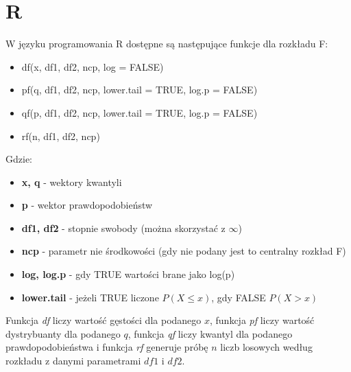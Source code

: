 \documentclass{article}
\begin{document}
{\section{R}
W języku programowania R dostępne są następujące funkcje dla rozkładu F:
\begin{itemize}
\item df(x, df1, df2, ncp, log = FALSE)
\item pf(q, df1, df2, ncp, lower.tail = TRUE, log.p = FALSE)
\item qf(p, df1, df2, ncp, lower.tail = TRUE, log.p = FALSE)
\item rf(n, df1, df2, ncp)
\end{itemize}
Gdzie:
\begin{itemize}
\item \textbf{x, q} - wektory kwantyli
\item \textbf{p} - wektor prawdopodobieństw
\item \textbf{df1, df2} - stopnie swobody (można skorzystać z $\infty$)
\item \textbf{ncp} - parametr nie środkowości (gdy nie podany jest to centralny rozkład F)
\item \textbf{log, log.p} - gdy TRUE wartości brane jako log(p)
\item \textbf{lower.tail} - jeżeli TRUE liczone $P(X \leq x)$, gdy FALSE $P(X > x)$
\end{itemize} 
Funkcja \textit{df} liczy wartość gęstości dla podanego $x$, funkcja \textit{pf} liczy wartość dystrybuanty dla podanego $q$, funkcja \textit{qf} liczy kwantyl dla podanego prawdopodobieństwa i funkcja \textit{rf} generuje próbę $n$ liczb losowych według rozkładu z danymi parametrami $df1$ i $df2$.

\newpage
}
\end{document}
